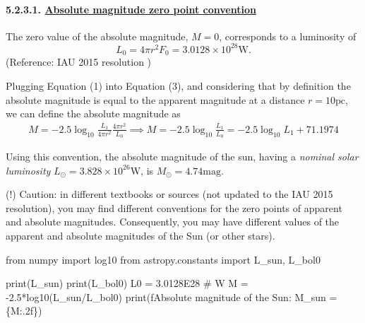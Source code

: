 \documentclass[
  letterpaper,
  DIV=11,
  numbers=noendperiod]{scrartcl}
\let\oldparagraph\paragraph
\renewcommand{\paragraph}[1]{\oldparagraph{#1}\mbox{}}
\newenvironment{Shaded}{\begin{snugshade}}{\end{snugshade}}
\newcommand{\BuiltInTok}[1]{\textcolor[rgb]{0.00,0.23,0.31}{#1}}
\newcommand{\CommentTok}[1]{\textcolor[rgb]{0.37,0.37,0.37}{#1}}
\newcommand{\FloatTok}[1]{\textcolor[rgb]{0.68,0.00,0.00}{#1}}
\newcommand{\ImportTok}[1]{\textcolor[rgb]{0.00,0.46,0.62}{#1}}
\newcommand{\NormalTok}[1]{\textcolor[rgb]{0.00,0.23,0.31}{#1}}
\newcommand{\OperatorTok}[1]{\textcolor[rgb]{0.37,0.37,0.37}{#1}}
\newcommand{\SpecialCharTok}[1]{\textcolor[rgb]{0.37,0.37,0.37}{#1}}
\newcommand{\SpecialStringTok}[1]{\textcolor[rgb]{0.13,0.47,0.30}{#1}}
\begin{document}
\hypertarget{absolute-magnitude-zero-point-convention}{%
\paragraph{\texorpdfstring{5.2.3.1. \protect\hyperlink{toc0_}{Absolute
magnitude zero point
convention}}{5.2.3.1. Absolute magnitude zero point convention}}\label{absolute-magnitude-zero-point-convention}}

The zero value of the absolute magnitude, \(M=0\), corresponds to a
luminosity of
\[ L_0 = 4\pi r^2 F_0 = 3.0128 \times 10^{28} \mathrm{W}.\] (Reference:
IAU 2015 resolution )

Plugging Equation (1) into Equation (3), and considering that by
definition the absolute magnitude is equal to the apparent magnitude at
a distance \(r=10\mathrm{pc}\), we can define the absolute magnitude as
\begin{align}
M = -2.5\log_{10}{\frac{L_1}{4\pi r^2}\frac{4 \pi r^2}{L_0}} \implies M = -2.5 \log_{10}{\frac{L_1}{L_0}} = -2.5\log_{10} L_1 + 71.1974
\end{align}

Using this convention, the absolute magnitude of the sun, having a
\emph{nominal solar luminosity}
\(L_\odot = 3.828 \times 10^{26} \mathrm{W}\), is
\(M_\odot = 4.74\mathrm{mag}.\)

(!) Caution: in different textbooks or sources (not updated to the IAU
2015 resolution), you may find different conventions for the zero points
of apparent and absolute magnitudes. Consequently, you may have
different values of the apparent and absolute magnitudes of the Sun (or
other stars).

\begin{Shaded}
\begin{Highlighting}[]
\ImportTok{from}\NormalTok{ numpy }\ImportTok{import}\NormalTok{ log10}
\ImportTok{from}\NormalTok{ astropy.constants }\ImportTok{import}\NormalTok{ L\_sun, L\_bol0}

\BuiltInTok{print}\NormalTok{(L\_sun)}
\BuiltInTok{print}\NormalTok{(L\_bol0)}
\NormalTok{L0 }\OperatorTok{=} \FloatTok{3.0128E28} \CommentTok{\# W}
\NormalTok{M }\OperatorTok{=} \OperatorTok{{-}}\FloatTok{2.5}\OperatorTok{*}\NormalTok{log10(L\_sun}\OperatorTok{/}\NormalTok{L\_bol0)}
\BuiltInTok{print}\NormalTok{(}\SpecialStringTok{f\textquotesingle{}Absolute magnitude of the Sun: M\_sun = }\SpecialCharTok{\{}\NormalTok{M}\SpecialCharTok{:.2f\}}\SpecialStringTok{\textquotesingle{}}\NormalTok{)}
\end{Highlighting}
\end{Shaded}
\end{document}
